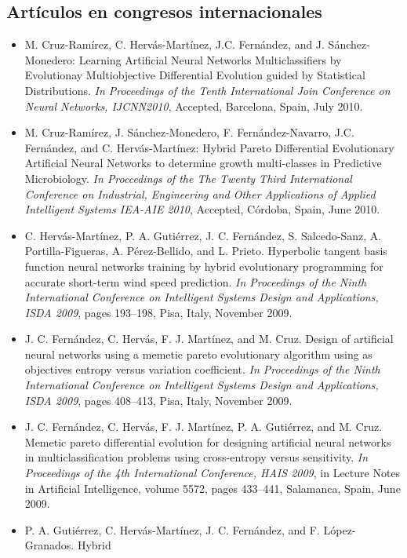 \subsection{Artículos en congresos internacionales}
\begin{itemize}
	\item M. Cruz-Ramírez, C. Hervás-Martínez, J.C. Fernández, and J. Sánchez-Monedero: Learning
			Artificial Neural Networks Multiclassifiers by Evolutionay Multiobjective Differential
			Evolution guided by Statistical Distributions. \textit{In Proceedings of the Tenth
			International Join Conference on Neural Networks, IJCNN2010}, Accepted, Barcelona,
			Spain, July 2010.
	\item M. Cruz-Ramírez, J. Sánchez-Monedero, F. Fernández-Navarro, J.C. Fernández, and C.
			Hervás-Martínez: Hybrid Pareto Differential Evolutionary Artificial Neural Networks to
			determine growth multi-classes in Predictive Microbiology. \textit{In Proccedings of the
			The Twenty	Third International Conference on Industrial, Engineering and Other
			Applications of Applied	Intelligent Systems IEA-AIE 2010}, Accepted, Córdoba, Spain,
			June 2010.
	\item C. Hervás-Martínez, P. A. Gutiérrez, J. C. Fernández, S. Salcedo-Sanz, A.
			Portilla-Figueras, A. Pérez-Bellido, and L. Prieto. Hyperbolic tangent basis
			function neural networks training by hybrid evolutionary programming for accurate
			short-term wind speed prediction. \textit{In Proceedings of the Ninth International
			Conference on Intelligent Systems Design and	Applications, ISDA 2009}, pages 193–198,
			Pisa, Italy, November 2009.
	\item J. C. Fernández, C. Hervás, F. J. Martínez, and M. Cruz. Design of artificial neural
			networks
			using a memetic pareto evolutionary algorithm using as objectives entropy versus variation
			coefficient. \textit{In Proceedings of the Ninth International Conference on Intelligent
			Systems Design and Applications, ISDA 2009}, pages 408–413, Pisa, Italy, November
			2009.
	\item J. C. Fernández, C. Hervás, F. J. Martínez, P. A. Gutiérrez, and M. Cruz. Memetic
			pareto differential evolution for designing artificial neural networks in
			multiclassification problems using cross-entropy versus sensitivity. \textit{In Proceedings
			of the 4th International Conference, HAIS 2009}, in Lecture Notes in Artificial
			Intelligence, volume 5572, pages 433–441, Salamanca, Spain, June 2009.
	\item P. A. Gutiérrez, C. Hervás-Martínez, J. C. Fernández, and F. López-Granados. Hybrid

\end{itemize}
